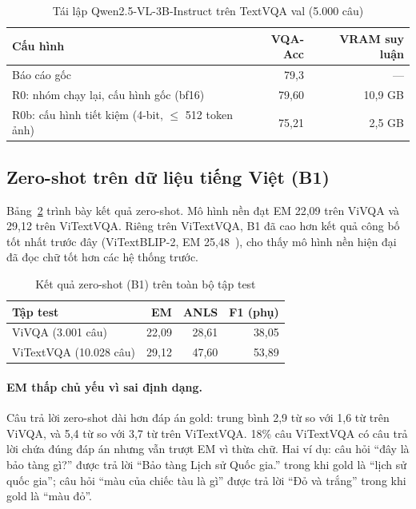 \begin{table}[htbp]
\caption{Tái lập Qwen2.5-VL-3B-Instruct trên TextVQA val (5.000 câu)}
\label{tab:res-r0}
\centering
\small
\begin{tabular}{p{}rr}
\toprule
\textbf{Cấu hình} & \textbf{VQA-Acc} & \textbf{VRAM suy luận} \\
\midrule
Báo cáo gốc~\cite{bai2025qwen25vl} & 79,3 & --- \\
R0: nhóm chạy lại, cấu hình gốc (bf16) & 79,60 & 10,9 GB \\
R0b: cấu hình tiết kiệm (4-bit, $\leq$ 512 token ảnh) & 75,21 & 2,5 GB \\
\bottomrule
\end{tabular}
\end{table}

\subsection{Zero-shot trên dữ liệu tiếng Việt (B1)}

Bảng~\ref{tab:res-b1} trình bày kết quả zero-shot. Mô hình nền đạt EM 22,09 trên
ViVQA và 29,12 trên ViTextVQA. Riêng trên ViTextVQA, B1 đã cao hơn kết quả công
bố tốt nhất trước đây (ViTextBLIP-2, EM 25,48~\cite{nguyen2024vitextvqa}), cho
thấy mô hình nền hiện đại đã đọc chữ tốt hơn các hệ thống trước.

\begin{table}[htbp]
\caption{Kết quả zero-shot (B1) trên toàn bộ tập test}
\label{tab:res-b1}
\centering
\small
\begin{tabular}{lrrr}
\toprule
\textbf{Tập test} & \textbf{EM} & \textbf{ANLS} & \textbf{F1 (phụ)} \\
\midrule
ViVQA (3.001 câu) & 22,09 & 28,61 & 38,05 \\
ViTextVQA (10.028 câu) & 29,12 & 47,60 & 53,89 \\
\bottomrule
\end{tabular}
\end{table}

\paragraph{EM thấp chủ yếu vì sai định dạng.} Câu trả lời zero-shot dài hơn đáp án
gold: trung bình 2,9 từ so với 1,6 từ trên ViVQA, và 5,4 từ so với 3,7 từ trên
ViTextVQA. 18\% câu ViTextVQA có câu trả lời chứa đúng đáp án nhưng vẫn trượt EM
vì thừa chữ. Hai ví dụ: câu hỏi ``đây là bảo tàng gì?'' được trả lời ``Bảo tàng
Lịch sử Quốc gia.'' trong khi gold là ``lịch sử quốc gia''; câu hỏi ``màu của
chiếc tàu là gì'' được trả lời ``Đỏ và trắng'' trong khi gold là ``màu đỏ''.


